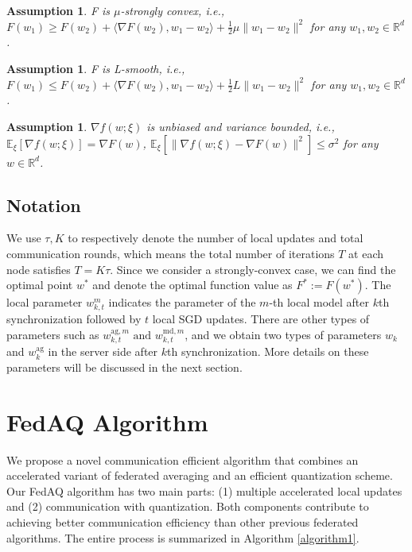 \documentclass[11pt]{article}
\newtheorem{assumption}[theorem]{Assumption}
\begin{document}
\begin{assumption} \label{assumption2}
F is $\mu$-strongly convex, i.e., $F(w_1) \geq F(w_2) + \langle \nabla F(w_2), w_1-w_2 \rangle + \frac{1}{2}\mu \|w_1-w_2\|^2$ for any $w_1, w_2 \in \mathbb{R}^d$.
\end{assumption}

\begin{assumption} \label{assumption3}
F is L-smooth, i.e., $F(w_1) \leq F(w_2) + \langle \nabla F(w_2), w_1-w_2 \rangle + \frac{1}{2}L \|w_1-w_2\|^2$ for any $w_1, w_2 \in \mathbb{R}^d$.
\end{assumption}

\begin{assumption} \label{assumption4}
$\nabla f(w; \xi)$ is unbiased and variance bounded, i.e., $\mathbb{E}_\xi[\nabla f(w; \xi)] = \nabla F(w)$, $\mathbb{E}_\xi[\|\nabla f(w; \xi) - \nabla F(w)\|^2] \leq \sigma^2$ for any $w \in \mathbb{R}^d$.
\end{assumption}


\subsection{Notation}

We use $\tau, K$ to respectively denote the number of local updates and total communication rounds, which means the total number of iterations $T$ at each node satisfies $T = K\tau$. Since we consider a strongly-convex case, we can find the optimal point $w^*$ and denote the optimal function value as $F^* := F(w^*)$. The local parameter $w_{k, t}^m$ indicates the parameter of the $m$-th local model after $k$th synchronization followed by $t$ local SGD updates. There are other types of parameters such as $w_{k, t}^{\textrm{ag}, m} \textrm{ and } w_{k, t}^{\textrm{md}, m}$, and we obtain two types of parameters $w_k$ and $w_k^{\textrm{ag}}$ in the server side after $k$th synchronization. More details on these parameters will be discussed in the next section.


\section{FedAQ Algorithm}

We propose a novel communication efficient algorithm that combines an accelerated variant of federated averaging and an efficient quantization scheme. Our FedAQ algorithm has two main parts: (1) multiple accelerated local updates and (2) communication with quantization. Both components contribute to achieving better communication efficiency than other previous federated algorithms. The entire process is summarized in Algorithm \ref{algorithm1}. %
\end{document}

